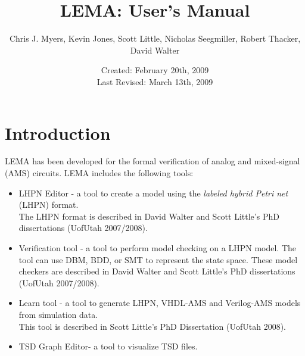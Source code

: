 \documentclass[titlepage,11pt]{article}
\title{LEMA: User's Manual}
\author{Chris J. Myers, Kevin Jones, Scott Little, Nicholas Seegmiller, Robert Thacker, David Walter}
\date{Created: February 20th, 2009\\
  Last Revised: March 13th, 2009
}
\begin{document}
\maketitle

  
\tableofcontents

\clearpage
  

\section{Introduction}

\noindent
LEMA has been developed for the formal verification of analog and mixed-signal (AMS) circuits.  LEMA includes the following tools: 

\begin{itemize}
\item LHPN Editor - a tool to create a model using the 
\emph{labeled hybrid Petri net} (LHPN) format.\\ 
The LHPN format is described in
David Walter and Scott Little's PhD dissertations
(UofUtah 2007/2008).
\item Verification tool - a tool to perform model checking on a LHPN model.  The tool can use DBM, BDD, or SMT to represent the state space.
These model checkers are described in
David Walter and Scott Little's PhD dissertations
(UofUtah 2007/2008).
\item Learn tool - a tool to generate LHPN, VHDL-AMS and Verilog-AMS models from simulation data.\\
This tool is described in 
Scott Little's PhD Dissertation
(UofUtah 2008).
\item TSD Graph Editor- a tool to visualize TSD files. 
\end{itemize}
\end{document}
